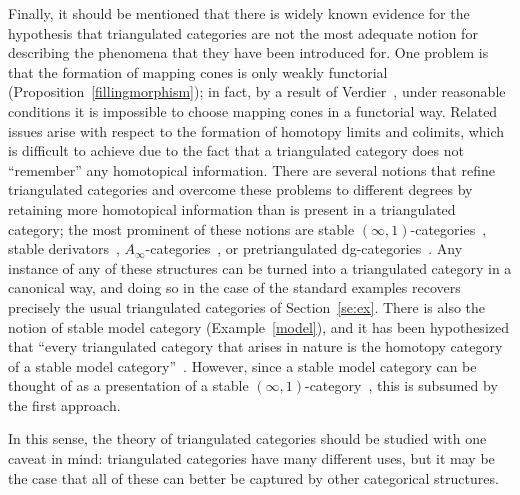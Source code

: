 \documentclass{amsproc}
\theoremstyle{definition}
\begin{document}
Finally, it should be mentioned that there is widely known evidence for the hypothesis that triangulated categories are not the most adequate notion for describing the phenomena that they have been introduced for. One problem is that the formation of mapping cones is only weakly functorial (Proposition~\ref{fillingmorphism}); in fact, by a result of Verdier~\cite{Stev}, under reasonable conditions it is impossible to choose mapping cones in a functorial way. Related issues arise with respect to the formation of homotopy limits and colimits, which is difficult to achieve due to the fact that a triangulated category does not ``remember'' any homotopical information. There are several notions that refine triangulated categories and overcome these problems to different degrees by retaining more homotopical information than is present in a triangulated category; the most prominent of these notions are stable $(\infty,1)$-categories~\cite{Lurie}, stable derivators~\cite{Heller,Groth}, $A_\infty$-categories~\cite{BLM}, or pretriangulated dg-categories~\cite{BK}. Any instance of any of these structures can be turned into a triangulated category in a canonical way, and doing so in the case of the standard examples recovers precisely the usual triangulated categories of Section~\ref{se:ex}. There is also the notion of stable model category (Example~\ref{model}), and it has been hypothesized that ``every triangulated category that arises in nature is the homotopy category of a stable model category''~\cite[Ch.~7]{Hov}. However, since a stable model category can be thought of as a presentation of a stable $(\infty,1)$-category~\cite{Lurie}, this is subsumed by the first approach.

In this sense, the theory of triangulated categories should be studied with one caveat in mind: triangulated categories have many different uses, but it may be the case that all of these can better be captured by other categorical structures.



\end{document}
